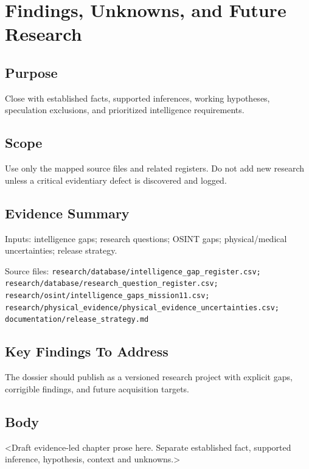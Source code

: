
\chapter{Findings, Unknowns, and Future Research}
\label{chap:12-findings-unknowns}


\section{Purpose}
Close with established facts, supported inferences, working hypotheses, speculation exclusions, and prioritized intelligence requirements.

\section{Scope}
Use only the mapped source files and related registers. Do not add new research unless a critical evidentiary defect is discovered and logged.

\section{Evidence Summary}
Inputs: intelligence gaps; research questions; OSINT gaps; physical/medical uncertainties; release strategy.

Source files: \texttt{research/database/intelligence_gap_register.csv; research/database/research_question_register.csv; research/osint/intelligence_gaps_mission11.csv; research/physical_evidence/physical_evidence_uncertainties.csv; documentation/release_strategy.md}

\section{Key Findings To Address}
The dossier should publish as a versioned research project with explicit gaps, corrigible findings, and future acquisition targets.

\section{Body}
<Draft evidence-led chapter prose here. Separate established fact, supported inference, hypothesis, context and unknowns.>


